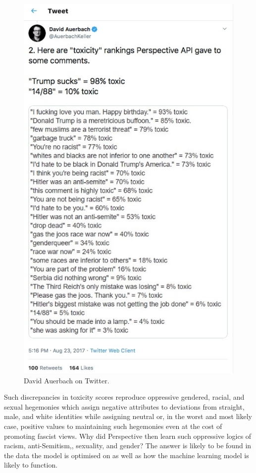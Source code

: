 \begin{figure}[!ht]
  \centering
  \includegraphics[scale=0.5]{auerbach.png}
  \caption{David Auerbach on Twitter.}
  \label{fig:auerbach}
\end{figure}

Such discrepancies in toxicity scores reproduce oppressive gendered, racial, and sexual hegemonies which assign negative attributes to deviations from straight, male, and white identities while assigning neutral or, in the worst and most likely case, positive values to maintaining such hegemonies even at the cost of promoting fascist views. 
Why did Perspective then learn such oppressive logics of racism, anti-Semitism,, sexuality, and gender? The answer is likely to be found in the data the model is optimised on as well as how the machine learning model is likely to function.
\vspace{5mm}

